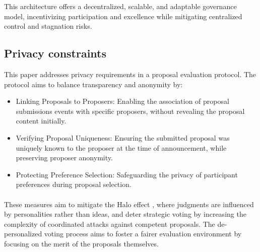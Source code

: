 \documentclass{article}
\begin{document}
\begin{CJK}{UTF8}{gbsn}
\begin{multicols}{2}
            This architecture offers a decentralized, scalable, and adaptable governance model, incentivizing participation and excellence while mitigating centralized control and stagnation risks.


            \subsection{Privacy constraints}

            This paper addresses privacy requirements in a proposal evaluation protocol. The protocol aims to balance transparency and anonymity by:
            \begin{itemize}[nosep]
                \item Linking Proposals to Proposers: Enabling the association of proposal submissions events with specific proposers, without revealing the proposal content initially.
                \item Verifying Proposal Uniqueness: Ensuring the submitted proposal was uniquely known to the proposer at the time of announcement, while preserving proposer anonymity.
                \item Protecting Preference Selection: Safeguarding the privacy of participant preferences during proposal selection.

            \end{itemize}
            \paragraph{}

            These measures aim to mitigate the Halo effect \cite{Verhulst2010}, where judgments are influenced by personalities rather than ideas, and deter strategic voting by increasing the complexity of coordinated attacks against competent proposals. The de-personalized voting process aims to foster a fairer evaluation environment by focusing on the merit of the proposals themselves.



\end{multicols}
\end{CJK}
\end{document}
